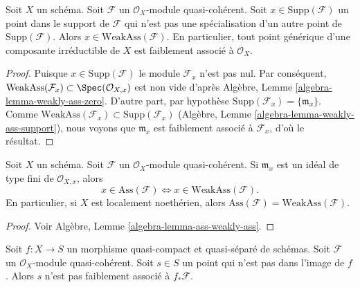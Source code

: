 \begin{lemma}
\label{lemma-minimal-support-in-weakly-ass}
Soit  $X$  un schéma. Soit  $\mathcal{F}$  un  $\mathcal{O}_X$-module
quasi-cohérent. Soit  $x \in \text{Supp}(\mathcal{F})$  un point dans le support de  $\mathcal{F}$  qui
n'est pas une spécialisation d'un autre point de  $\text{Supp}(\mathcal{F})$. Alors  $x \in \text{WeakAss}(\mathcal{F})$.
En particulier, tout point générique d'une composante irréductible de  $X$ 
est faiblement associé à  $\mathcal{O}_X$.
\end{lemma}

\begin{proof}
Puisque  $x \in \text{Supp}(\mathcal{F})$  le module  $\mathcal{F}_x$  n'est pas nul. Par conséquent,
 $\text{WeakAss}(\mathcal{F}_x) \subset \Spec(\mathcal{O}_{X, x})$  est non vide d'après Algèbre, Lemme  \ref{algebra-lemma-weakly-ass-zero}. D'autre part, par
hypothèse  $\text{Supp}(\mathcal{F}_x) = \{\mathfrak m_x\}$. Comme  $\text{WeakAss}(\mathcal{F}_x) \subset \text{Supp}(\mathcal{F}_x)$  (Algèbre, Lemme  \ref{algebra-lemma-weakly-ass-support}), nous
voyons que  $\mathfrak m_x$  est faiblement associé à  $\mathcal{F}_x$, d'où le résultat.
\end{proof}

\begin{lemma}
\label{lemma-ass-weakly-ass}
Soit  $X$  un schéma. Soit  $\mathcal{F}$  un  $\mathcal{O}_X$-module
quasi-cohérent. Si  $\mathfrak m_x$  est un idéal de type fini de  $\mathcal{O}_{X, x}$, alors
$$
x \in \text{Ass}(\mathcal{F}) \Leftrightarrow
x \in \text{WeakAss}(\mathcal{F}).
$$
En particulier, si  $X$  est localement noethérien, alors  $\text{Ass}(\mathcal{F}) = \text{WeakAss}(\mathcal{F})$.
\end{lemma}

\begin{proof}
Voir Algèbre, Lemme  \ref{algebra-lemma-ass-weakly-ass}.
\end{proof}

\begin{lemma}
\label{lemma-weakass-pushforward}
Soit  $f : X \to S$  un morphisme quasi-compact et quasi-séparé de schémas. Soit
 $\mathcal{F}$  un  $\mathcal{O}_X$-module quasi-cohérent. Soit  $s \in S$  un point qui
n'est pas dans l'image de  $f$. Alors  $s$  n'est pas faiblement
associé à  $f_*\mathcal{F}$.
\end{lemma}

